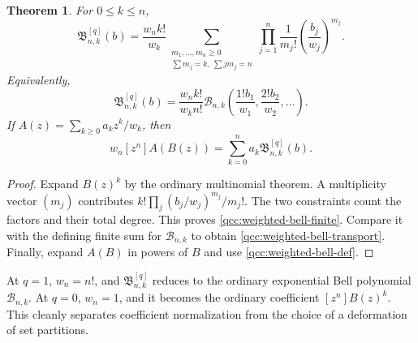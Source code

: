\documentclass[11pt,a4paper,oneside,openany]{book}
\newtheorem{theorem}{Theorem}[chapter]
\theoremstyle{definition}
\theoremstyle{remark}
\newcommand{\B}[2]{\mathcal B_{#1,#2}}
\newcommand{\qB}[2]{\mathfrak B^{[q]}_{#1,#2}}
\begin{document}
\begin{theorem}\label{qcc:weighted-bell}
For \(0\le k\le n\),
\begin{equation}\label{qcc:weighted-bell-finite}
 \qB nk(b)=\frac{w_nk!}{w_k}
 \sum_{\substack{m_1,\ldots,m_n\ge0\\\sum m_j=k,\ \sum j m_j=n}}
 \prod_{j=1}^n\frac1{m_j!}\left(\frac{b_j}{w_j}\right)^{m_j}.
\end{equation}
Equivalently,
\begin{equation}\label{qcc:weighted-bell-transport}
 \qB nk(b)=\frac{w_nk!}{w_kn!}\B nk
       \left(\frac{1!b_1}{w_1},\frac{2!b_2}{w_2},\ldots\right).
\end{equation}
If \(A(z)=\sum_{k\ge0}a_kz^k/w_k\), then
\begin{equation}\label{qcc:composition-formula}
 w_n[z^n]A(B(z))=\sum_{k=0}^n a_k\qB nk(b).
\end{equation}
\end{theorem}
\begin{proof}
Expand \(B(z)^k\) by the ordinary multinomial theorem. A multiplicity vector
\((m_j)\) contributes \(k!\prod_j(b_j/w_j)^{m_j}/m_j!\).
The two constraints count the factors and their total degree. This proves
\eqref{qcc:weighted-bell-finite}. Compare it with the defining finite sum for
\(\B nk\) to obtain \eqref{qcc:weighted-bell-transport}. Finally, expand
\(A(B)\) in powers of \(B\) and use \eqref{qcc:weighted-bell-def}.
\end{proof}
At \(q=1\), \(w_n=n!\), and \(\mathfrak B^{[q]}_{n,k}\) reduces to the
ordinary exponential Bell polynomial \(\B nk\). At \(q=0\), \(w_n=1\),
and it becomes the ordinary coefficient \([z^n]B(z)^k\). This cleanly separates
coefficient normalization from the choice of a deformation of set partitions.
\end{document}
